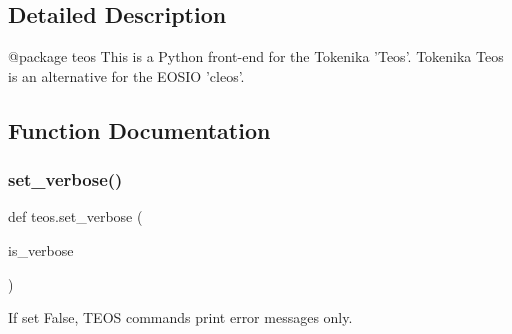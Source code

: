 \subsection{Detailed Description}
\begin{DoxyVerb}@package teos
This is a Python front-end for the Tokenika 'Teos'. Tokenika Teos is an 
alternative for the EOSIO 'cleos'.
\end{DoxyVerb}
 

\subsection{Function Documentation}
\mbox{\label{namespaceteos_ad3f18507d29c48d8e32e8f7376722a7b}} 
\subsubsection{\texorpdfstring{set\+\_\+verbose()}{set\_verbose()}}
{\footnotesize\ttfamily def teos.\+set\+\_\+verbose (\begin{DoxyParamCaption}\item[{}]{is\+\_\+verbose }\end{DoxyParamCaption})}



If set False, T\+E\+OS commands print error messages only. 

